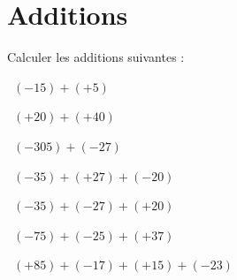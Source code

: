 
	\section{Additions}
	
	Calculer les additions suivantes :
	\begin{questions}
	
		\question[1]  $(-15) + (+ 5)$
		\fillwithdottedlines{1cm}
		\begin{solution}
			
		\end{solution}
	
		\question[1]  $(+20) + (+ 40)$
		\fillwithdottedlines{1cm}
		\begin{solution}
			
		\end{solution}
	
	
		
	
		\question[1]  $(-305) + (-27)$
		\fillwithdottedlines{1cm}
		\begin{solution}
			
		\end{solution}
	
	
		\question[1]  $(-35) + (+27)  + (-20)$
		\fillwithdottedlines{1.5cm}
		\begin{solution}
			
		\end{solution}
	
	
		\question[2]  $(-35) + (-27)  + (+20)$
		\fillwithdottedlines{1.5cm}
		\begin{solution}
			
		\end{solution}
	
	
	
	
		\question[2]  $(-75) + (-25) + (+37)$
		\fillwithdottedlines{1.5cm}
		\begin{solution}
			
		\end{solution}
	
	
		\question[2]  $(+85) + (-17) + (+15) + (-23)$ 
		\fillwithdottedlines{2cm}
		\begin{solution}
			
		\end{solution}
	
	
%			
	\end{questions}
	
